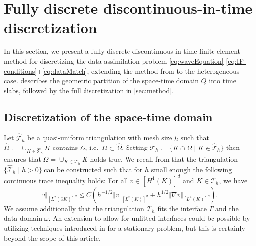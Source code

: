 \documentclass[sn-mathphys-num]{sn-jnl}
\numberwithin{equation}{section}
\begin{document}
\section{Fully discrete discontinuous-in-time discretization}\label{sec:discretization} 
In this section, we present a fully discrete discontinuous-in-time finite element method for discretizing the data assimilation problem \eqref{eq:waveEquation}-\eqref{eq:IF-conditions}+\eqref{eq:dataMatch}, extending the method from \cite{BP24} to the heterogeneous case.  describes the geometric partition of the space-time domain $Q$ into time slabs, followed by the full discretization in \cref{sec:method}.

\subsection{Discretization of the space-time domain}\label{sec:spaceTimeDiscretization}
Let $\hat{\mathcal{T}}_h$ be a quasi-uniform triangulation with mesh size $h$ such that $\hat{\Omega}:= \cup_{K \in \hat{\mathcal{T}}_h} K $ contains $\Omega$, i.e.\ $\Omega \subset \hat{\Omega}$. Setting $\mathcal{T}_h := \{ K \cap \Omega \mid K \in  \hat{\mathcal{T}}_h \}$ then ensures that $\Omega = \cup_{K \in \mathcal{T}_h} K$ holds true.  
We recall from  \cite[Sec. 4.2]{BFMO21control} that the triangulation $\{ \hat{\mathcal{T}}_h \mid h > 0 \}$ can be constructed such that for $h$ small enough the following continuous trace inequality holds:  For all $v \in [H^1(K)]^d$ and $K \in \mathcal{T}_h$, we have
\begin{equation}\label{eq:traceInequality}
    \Vert v \Vert_{[L^2(\partial K)]^d} \le C \left(h^{-1/2} \Vert v \Vert_{[L^2(K)]^d} + h^{1/2} \Vert \nabla v \Vert_{[L^2(K)]^d} \right).  
\end{equation}
We assume additionally that the triangulation $\mathcal{T}_h$ fits the interface $\Gamma$ and the data domain $\omega$. An extension to allow for unfitted interfaces could be possible by utilizing techniques introduced in \cite{BP25} for a stationary problem, but this is certainly beyond the scope of this article. 
\end{document}
